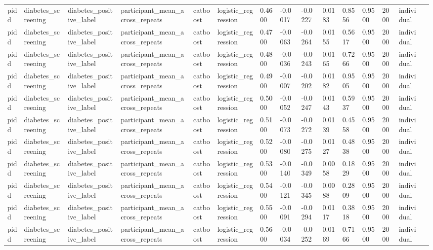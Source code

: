\begin{tabular}{lllllllllllllll}
pidd & diabetes\_screening & diabetes\_positive\_label & participant\_mean\_across\_repeats & catboost & logistic\_regression & 0.4600 & -0.0017 & -0.0227 & 0.0183 & 0.8556 & 0.9500 & 2000 & individual &  \\
pidd & diabetes\_screening & diabetes\_positive\_label & participant\_mean\_across\_repeats & catboost & logistic\_regression & 0.4700 & -0.0063 & -0.0264 & 0.0155 & 0.5617 & 0.9500 & 2000 & individual &  \\
pidd & diabetes\_screening & diabetes\_positive\_label & participant\_mean\_across\_repeats & catboost & logistic\_regression & 0.4800 & -0.0036 & -0.0243 & 0.0165 & 0.7266 & 0.9500 & 2000 & individual &  \\
pidd & diabetes\_screening & diabetes\_positive\_label & participant\_mean\_across\_repeats & catboost & logistic\_regression & 0.4900 & -0.0007 & -0.0202 & 0.0182 & 0.9505 & 0.9500 & 2000 & individual &  \\
pidd & diabetes\_screening & diabetes\_positive\_label & participant\_mean\_across\_repeats & catboost & logistic\_regression & 0.5000 & -0.0052 & -0.0247 & 0.0143 & 0.5937 & 0.9500 & 2000 & individual &  \\
pidd & diabetes\_screening & diabetes\_positive\_label & participant\_mean\_across\_repeats & catboost & logistic\_regression & 0.5100 & -0.0073 & -0.0272 & 0.0139 & 0.4558 & 0.9500 & 2000 & individual &  \\
pidd & diabetes\_screening & diabetes\_positive\_label & participant\_mean\_across\_repeats & catboost & logistic\_regression & 0.5200 & -0.0080 & -0.0275 & 0.0127 & 0.4838 & 0.9500 & 2000 & individual &  \\
pidd & diabetes\_screening & diabetes\_positive\_label & participant\_mean\_across\_repeats & catboost & logistic\_regression & 0.5300 & -0.0140 & -0.0349 & 0.0058 & 0.1829 & 0.9500 & 2000 & individual &  \\
pidd & diabetes\_screening & diabetes\_positive\_label & participant\_mean\_across\_repeats & catboost & logistic\_regression & 0.5400 & -0.0121 & -0.0345 & 0.0088 & 0.2809 & 0.9500 & 2000 & individual &  \\
pidd & diabetes\_screening & diabetes\_positive\_label & participant\_mean\_across\_repeats & catboost & logistic\_regression & 0.5500 & -0.0091 & -0.0294 & 0.0117 & 0.3818 & 0.9500 & 2000 & individual &  \\
pidd & diabetes\_screening & diabetes\_positive\_label & participant\_mean\_across\_repeats & catboost & logistic\_regression & 0.5600 & -0.0034 & -0.0252 & 0.0169 & 0.7166 & 0.9500 & 2000 & individual &  \\

\end{tabular}
